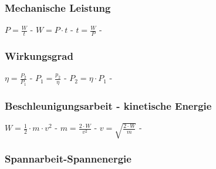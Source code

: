 \subsubsection{Mechanische Leistung} 
\begin{minipage}{0.45\textwidth} 
\end{minipage} 
\begin{minipage}{0.45\textwidth} 
 
\legende{}\end{minipage} 
 
$ P = \frac{W}{t} $ - $ W = P\cdot t $ - $ t = \frac{W}{P} $ - \\ 
 
\subsubsection{Wirkungsgrad} 
\begin{minipage}{0.45\textwidth} 
\end{minipage} 
\begin{minipage}{0.45\textwidth} 
 
\legende{}\end{minipage} 
 
$ \eta  = \frac{P_{2} }{P_{1} } $ - $ P_{1}  = \frac{p_{2} }{\eta } $ - $ P_{2}  = \eta \cdot P_{1} $ - \\ 
 
\subsubsection{Beschleunigungsarbeit - kinetische Energie} 
\begin{minipage}{0.45\textwidth} 
\end{minipage} 
\begin{minipage}{0.45\textwidth} 
 
\legende{}\end{minipage} 
 
$ W = \frac{1}{2}\cdot m\cdot v^{2} $ - $ m = \frac{2\cdot W}{ v^{2} } $ - $ v = \sqrt{\frac{2\cdot W}{ m}} $ - \\ 
 
\subsubsection{Spannarbeit-Spannenergie} 
\begin{minipage}{0.45\textwidth} 
\end{minipage} 
\begin{minipage}{0.45\textwidth} 
 
\legende{}\end{minipage} 
 
